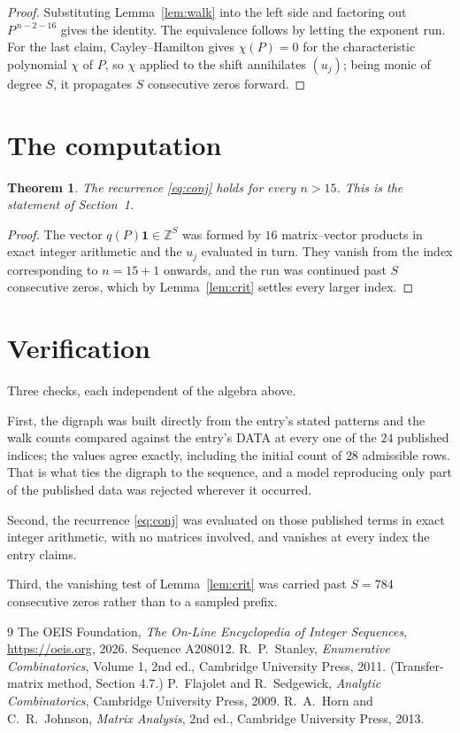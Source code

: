 \documentclass[11pt,a4paper]{article}
\theoremstyle{plain}
\newtheorem{theorem}{Theorem}
\theoremstyle{definition}
\begin{document}
\begin{proof}
Substituting Lemma~\ref{lem:walk} into the left side and factoring out
$P^{\,n-2-16}$ gives the identity. The equivalence follows by letting the exponent
run. For the last claim, Cayley--Hamilton gives $\chi(P)=0$ for the characteristic
polynomial $\chi$ of $P$, so $\chi$ applied to the shift annihilates $(u_j)$; being monic of
degree $S$, it propagates $S$ consecutive zeros forward.
\end{proof}

\section{The computation}

\begin{theorem}
The recurrence \eqref{eq:conj} holds for every $n>15$. This is the statement of
Section~1.
\end{theorem}

\begin{proof}
The vector $q(P)\mathbf{1}\in\mathbb{Z}^{S}$ was formed by $16$ matrix--vector
products in exact integer arithmetic and the $u_j$ evaluated in turn. They vanish from the
index corresponding to $n=15+1$ onwards, and the run was continued past $S$ consecutive
zeros, which by Lemma~\ref{lem:crit} settles every larger index.
\end{proof}

\section{Verification}

Three checks, each independent of the algebra above.

First, the digraph was built directly from the entry's stated patterns and the walk counts
compared against the entry's DATA at every one of the $24$ published indices; the
values agree exactly, including the initial count of $28$ admissible rows. That is
what ties the digraph to the sequence, and a model reproducing only part of the published
data was rejected wherever it occurred.

Second, the recurrence \eqref{eq:conj} was evaluated on those published terms in exact
integer arithmetic, with no matrices involved, and vanishes at every index the entry claims.

Third, the vanishing test of Lemma~\ref{lem:crit} was carried past $S=784$ consecutive
zeros rather than to a sampled prefix.

\begin{thebibliography}{9}
 The OEIS Foundation, \emph{The On-Line Encyclopedia of Integer
Sequences}, \url{https://oeis.org}, 2026. Sequence A208012.
 R.~P.~Stanley, \emph{Enumerative Combinatorics}, Volume 1, 2nd ed.,
Cambridge University Press, 2011. (Transfer-matrix method, Section 4.7.)
 P.~Flajolet and R.~Sedgewick, \emph{Analytic Combinatorics}, Cambridge
University Press, 2009.
 R.~A.~Horn and C.~R.~Johnson, \emph{Matrix Analysis}, 2nd ed., Cambridge
University Press, 2013.
\end{thebibliography}
\end{document}
